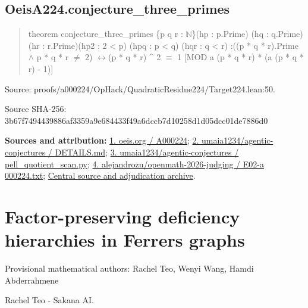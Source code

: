 \documentclass[11pt,a4paper]{article}
\begin{document}
\begin{samepage}
\subsection{OeisA224.conjecture\_three\_primes}
\begin{quote}\small\ttfamily theorem conjecture\_three\_primes \{p q r : \ensuremath{\mathbb{N}}\}\newline     (hp : p.Prime) (hq : q.Prime) (hr : r.Prime)\newline     (hp2 : 2 < p) (hpq : p < q) (hqr : q < r) :\newline     ((p * q * r).Prime \ensuremath{\wedge} p * q * r \ensuremath{\neq} 2) \ensuremath{\leftrightarrow}\newline       (p * q * r) \textasciicircum{} 2 \ensuremath{\equiv} 1 [MOD a (p * q * r) * (a (p * q * r) - 1)]\end{quote}
{\small Source: proofs/a000224/OpHack/QuadraticResidue224/Target224.lean:50.\par}

{\small Source SHA-256: 3b67f7494439886af3359a9e684433f49a6dccb7d10258d1d05dcc01de7886d0\par}

{\small\textbf{Sources and attribution:} \href{https://oeis.org/A000224}{1. oeis.org / A000224}; \href{https://github.com/umaia1234/agentic-conjectures/blob/96ea0039d9dc3a1940b9d5ec1cbe616ed58d1da2/problems/oeis-a000224/DETAILS.md}{2. umaia1234/agentic-conjectures / DETAILS.md}; \href{https://github.com/umaia1234/agentic-conjectures/blob/96ea0039d9dc3a1940b9d5ec1cbe616ed58d1da2/problems/oeis-a000224/pell_quotient_scan.py}{3. umaia1234/agentic-conjectures / pell\_quotient\_scan.py}; \href{https://github.com/alejandrozu/openmath-2026-judging/blob/d0ed487f487fa7ec814ff705ab55249983fe8707/OpenMath-Judging/review/entries/E02-a000224.txt}{4. alejandrozu/openmath-2026-judging / E02-a 000224.txt}; \href{https://github.com/alejandrozu/openmath-2026-judging}{Central source and adjudication archive}.\par}

\end{samepage}
\clearpage
\section{Factor-preserving deficiency hierarchies in Ferrers graphs}
{\small Provisional mathematical authors: Rachel Teo, Wenyi Wang, Hamdi Abderrahmene\par}\medskip
{\small Rachel Teo  -  Sakana AI.\par}
\end{document}

